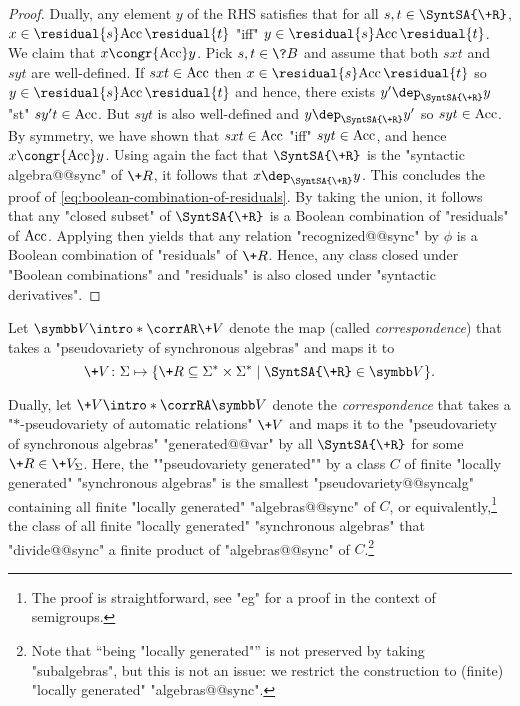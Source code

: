 \begin{proof}
	Dually, any element $y$ of the RHS satisfies that for all $s, t \in \SyntSA{\+R}$,
	$x \in \residual{s} \Acc\,\residual{t}$ "iff" $y \in \residual{s} \Acc\,\residual{t}$.
	We claim that $x \congr{\Acc} y$. Pick $s, t \in \?B$ and assume that
	both $sxt$ and $syt$ are well-defined. If $sxt \in \textrm{Acc}$ then $x \in \residual{s} \Acc\,\residual{t}$ so $y \in \residual{s} \Acc\,\residual{t}$ and hence, there
	exists $y' \dep_{\SyntSA{\+R}} y$ "st" $sy't \in \textrm{Acc}$. But $syt$ is also well-defined
	and $y \dep_{\SyntSA{\+R}} y'$ so $syt \in \textrm{Acc}$. By symmetry, we have shown that
	$sxt \in \textrm{Acc}$ "iff" $syt \in \textrm{Acc}$, and hence $x \congr{\Acc} y$.
	Using again the fact that $\SyntSA{\+R}$ is the "syntactic algebra@@sync" of $\+R$, it 
	follows that $x \dep_{\SyntSA{\+R}} y$. This concludes the proof of
	\eqref{eq:boolean-combination-of-residuals}. By taking the union, it
	follows that any "closed subset" of $\SyntSA{\+R}$ is a Boolean combination
	of "residuals" of $\textrm{Acc}$. Applying 
	then yields that any relation "recognized@@sync" by $\phi$ is a Boolean combination of 
	"residuals" of $\+R$. Hence, any class closed under "Boolean combinations" and
	"residuals" is also closed under "syntactic derivatives".
\end{proof}

Let \AP$\B{V} \intro*\corrAR \+V$ denote the map (called \emph{correspondence}) that takes a 
"pseudovariety of synchronous algebras" and maps it to
\[\+V\colon \Sigma \mapsto \{\+R \subseteq \Sigma^*\times \Sigma^* \mid \SyntSA{\+R} \in \B{V}\}.\]

Dually, let \AP$\+V \intro*\corrRA \B{V}$ denote the \emph{correspondence} that takes
a "$\ast$-pseudo\-variety of automatic relations" $\+V$
and maps it to the "pseudovariety of synchronous algebras" "generated@@var" by
all $\SyntSA{\+R}$ for some $\+R \in \+V_{\Sigma}$.
Here, the ""pseudovariety generated"" by a class $C$
of finite "locally generated" "synchronous algebras"
is the smallest "pseudovariety@@syncalg" containing
all finite "locally generated" "algebras@@sync" of $C$,
or equivalently,\footnote{The proof is straightforward,
see "eg" \cite[Proposition XI.1.1, p.~190]{Pin2022MathematicalFoundations} for a proof in the context of semigroups.} the class of all finite "locally generated" "synchronous algebras" 
that "divide@@sync" a finite product of "algebras@@sync" of $C$.\footnote{Note that ``being "locally generated"'' is not preserved by taking "subalgebras", but this is not an issue: we restrict the construction to (finite) "locally generated" "algebras@@sync".}

